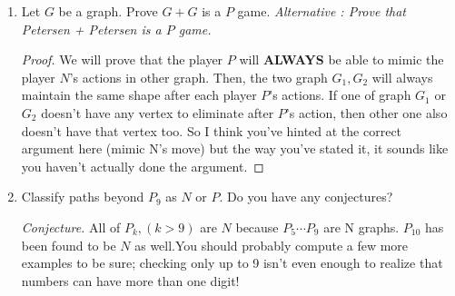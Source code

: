 \begin{enumerate}[leftmargin=*]
\begin{enumerate}
\begin{proof}
    If $N$ removes the $K_{1,5}$ nova, the situation becomes identical to the case we just examined. Therefore, $N$ wins in this instance as well. \color{red}Great!\color{black}
\end{proof}
\item Prove that a game of cutthroat on a collection of stars is a P game IFF there are an even number of odd stars and an even number of even stars. 
\begin{proof}
    ($\Leftarrow$) We will prove this by using induction.
    base step: Nothing exist. \color{red}Nothing is even. I concur.\color{black} Obviously $P$ game.
    induction step 1: If $G$ are $P$ game, then $G+K_{1,2k+1}+K_{1,2l+1}$ also $P$ game because if $N$ plays in $G$, $P$ can plays in $G$ by its own strategy. Or if $N$ plays in $K_{1,2k+1}$ or $K_{1,2l+1}$ then $P$ plays proper way to beat $N$. \color{red}uh what do you mean by ''the proper way to beat N"\color{black}
    induction step 2: If $G$ are $P$ game, then $G+K_{1,2k}+K_{1,2l}$ also $P$ game because by the same reason right above. \color{red}What about the other direction?\color{black}\color{amethyst}Yeah!  What are you HIDING?\color{black}
\end{proof}
\end{enumerate}
\item Let $G$ be a graph. Prove $G+G$ is a $P$ game. \textit{Alternative : Prove that Petersen + Petersen is a $P$ game.}
\begin{proof}
We will prove that the player $P$ will \textbf{ALWAYS} be able to mimic the player $N$'s actions in other graph. Then, the two graph $G_1, G_2$ will always maintain the same shape after each player $P$'s actions. If one of graph $G_1$ or $G_2$ doesn't have any vertex to eliminate after $P$'s action, then other one also doesn't have that vertex too.  \color{red}So I think you've hinted at the correct argument here (mimic N's move) but the way you've stated it, it sounds like you haven't actually done the argument.\color{black}
\end{proof}
\item Classify paths beyond $P_9$ as $N$ or $P$. Do you have any conjectures? 

\textit{Conjecture.} All of $P_k,(k>9)$ are $N$ because $P_5\cdots P_9$ are N graphs. $P_{10}$ has been found to be $N$ as well.\color{red}You should probably compute a few more examples to be sure; checking only up to 9 isn't even enough to realize that numbers can have more than one digit!\color{black}



\end{enumerate}

